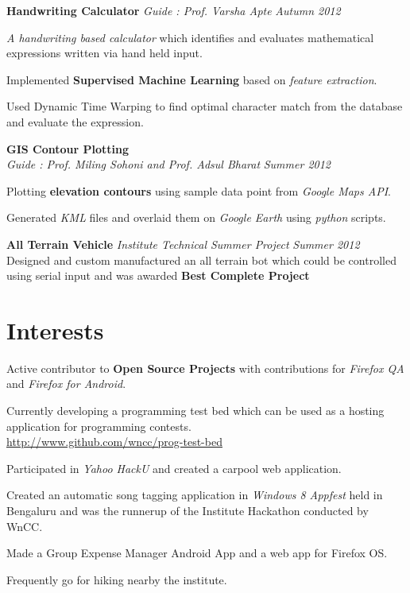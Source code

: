 \documentclass[margin,11pt]{resume}
\begin{document}
\begin{resume}
\textbf{Handwriting Calculator} \hfill
    \textsl{Guide : Prof. Varsha Apte} \hfill \emph{Autumn 2012}
\begin{list2}
\item \emph{A handwriting based calculator} which identifies and evaluates mathematical expressions written via hand held input.
\item Implemented \textbf{Supervised Machine Learning} based on \emph{feature extraction}. 
\item Used Dynamic Time Warping to find optimal character match from the database and evaluate the expression.
\end{list2}

\textbf{GIS Contour Plotting}\\
  \textsl{Guide : Prof. Miling Sohoni and Prof. Adsul Bharat} \hfill \emph{Summer 2012}
\begin{list2}
\item Plotting \textbf{elevation contours} using sample data point from \emph{Google Maps API}.
\item Generated \emph{KML} files and overlaid them on \emph{Google Earth} using \emph{python} scripts. \\
\end{list2}

\textbf{All Terrain Vehicle} \hfill
\textsl{Institute Technical Summer Project} \hfill \emph{Summer 2012} \\ 
Designed and custom manufactured an all terrain bot which could be controlled using serial input and was awarded \textbf{Best Complete Project}

\section{\mysidestyle Interests}

\begin{list2}
\item Active contributor to \textbf{Open Source Projects} with contributions for \emph{Firefox QA} and \emph{Firefox for Android}.
\item Currently developing a programming test bed which can be used as a hosting application for programming contests.\\ \url{http://www.github.com/wncc/prog-test-bed} 
\item Participated in \emph{Yahoo HackU} and created a carpool web application.
\item Created an automatic song tagging application in \emph{Windows 8 Appfest} held in Bengaluru and was the runnerup of the Institute Hackathon conducted by WnCC.
\item Made a Group Expense Manager Android App and a web app for Firefox OS.
\item Frequently go for hiking nearby the institute.
\end{list2}


\end{resume}
\end{document}

